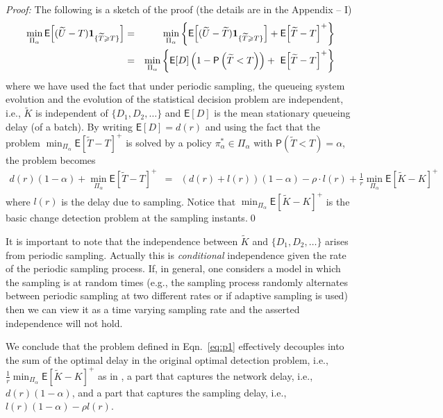 \documentclass[acmtosn]{acmtrans2m}
\newcommand{\prob}[1]{\mathsf{P}\left(#1\right)}
\newcommand{\EXP}[1]{\mathsf{E}\!\left[#1\right]}
\begin{document}
\emph{Proof:} The following is a sketch of the
  proof (the details are in the Appendix -- I)
\begin{eqnarray*}
  \min_{\Pi_{\alpha}}\EXP{(\widetilde{U}-T){\bf 1}_{\{\widetilde{T}\geqslant T\}}} 
  &=& \min_{\Pi_{\alpha}}\left\{\EXP{(\widetilde{U}-\widetilde{T}) {\bf 1}_{\{\widetilde{T}\geqslant T\}}}+\EXP{\widetilde{T}-T}^+\right\}\\
  &=&\min_{\Pi_\alpha}\left\{ \EXP{D}\left(1-\prob{\widetilde{T}<T}\right)+~\EXP{\widetilde{T}-T}^+\right\}
\end{eqnarray*}
where we have used the fact that under periodic sampling, the queueing
system evolution and the evolution of the statistical decision problem
are independent, i.e., $\widetilde{K}$ is independent of $\{D_1, D_2,
\ldots\}$ and $\EXP{D}$ is the mean stationary queueing delay (of a batch).  By
writing $\EXP{D}=d(r)$ and using the fact that the problem
$\min_{\Pi_{\alpha}}\EXP{\widetilde{T}-T}^+$ is solved by a policy
$\pi^*_\alpha \in \Pi_\alpha$ with $\prob{\widetilde{T}<T}=\alpha$, the
problem becomes
\begin{eqnarray*}
d(r)(1-\alpha) + \min_{\Pi_{\alpha}}\EXP{\widetilde{T}-T}^+
& = & (d(r)+l(r))(1-\alpha) -\rho\cdot l(r)+\frac{1}{r} \min_{\Pi_\alpha} {\EXP{\widetilde{K}-K}^+}
\end{eqnarray*}
where $l(r)$ is the delay due to sampling. Notice that $\min_{\Pi_\alpha} {\EXP{\widetilde{K}-K}^+}$
is the basic change detection problem at the sampling instants.\qed

\begin{remarks}It is important to note that the independence between
  $\widetilde{K}$ and $\{D_1, D_2, \ldots\}$ arises from periodic
  sampling. Actually this is \emph{conditional} independence given the
  rate of the periodic sampling process. If, in general, one considers
  a model in which the sampling is at random times (e.g., the sampling
  process randomly alternates between periodic sampling at two
  different rates or if adaptive sampling is used) then we can view it
  as a time varying sampling rate and the asserted independence will
  not hold. 
\end{remarks}


We conclude that the problem defined in Eqn.~\ref{eq:p1}
effectively decouples into the sum of the 
optimal delay in the original optimal detection problem, i.e.,
$\frac{1}{r}\min_{\Pi_{\alpha}}\EXP{\widetilde{K}-K}^+$ as in
\cite{veeravalli01decentralized-quickest}, a part that captures
the network delay, i.e., $d(r)(1-\alpha)$, and a part that 
captures the sampling delay, i.e., $l(r)(1-\alpha)-\rho l(r)$.
\end{document}
